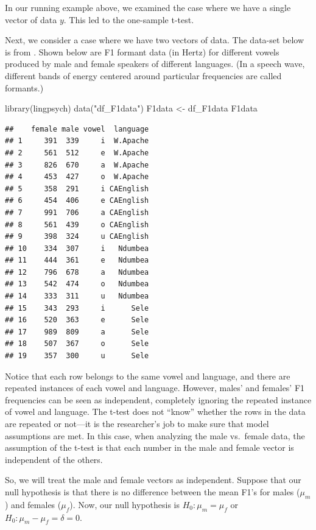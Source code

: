 \documentclass[
  12pt,
]{krantz}
\newenvironment{Shaded}{\begin{snugshade}}{\end{snugshade}}
\newcommand{\FunctionTok}[1]{\textcolor[rgb]{0.00,0.00,0.00}{#1}}
\newcommand{\NormalTok}[1]{#1}
\newcommand{\OtherTok}[1]{\textcolor[rgb]{0.56,0.35,0.01}{#1}}
\newcommand{\StringTok}[1]{\textcolor[rgb]{0.31,0.60,0.02}{#1}}
\theoremstyle{definition}
\theoremstyle{definition}
\theoremstyle{definition}
\theoremstyle{definition}
\theoremstyle{remark}
\begin{document}
In our running example above, we examined the case where we have a single vector of data \(y\). This led to the one-sample t-test.

Next, we consider a case where we have two vectors of data. The data-set below is from \citet{johnson2011quantitative}. Shown below are F1 formant data (in Hertz) for different vowels produced by male and female speakers of different languages. (In a speech wave, different bands of energy centered around particular frequencies are called formants.)

\begin{Shaded}
\begin{Highlighting}[]
\FunctionTok{library}\NormalTok{(lingpsych)}
\FunctionTok{data}\NormalTok{(}\StringTok{"df\_F1data"}\NormalTok{)}
\NormalTok{F1data }\OtherTok{\textless{}{-}}\NormalTok{ df\_F1data}
\NormalTok{F1data}
\end{Highlighting}
\end{Shaded}

\begin{verbatim}
##    female male vowel  language
## 1     391  339     i  W.Apache
## 2     561  512     e  W.Apache
## 3     826  670     a  W.Apache
## 4     453  427     o  W.Apache
## 5     358  291     i CAEnglish
## 6     454  406     e CAEnglish
## 7     991  706     a CAEnglish
## 8     561  439     o CAEnglish
## 9     398  324     u CAEnglish
## 10    334  307     i   Ndumbea
## 11    444  361     e   Ndumbea
## 12    796  678     a   Ndumbea
## 13    542  474     o   Ndumbea
## 14    333  311     u   Ndumbea
## 15    343  293     i      Sele
## 16    520  363     e      Sele
## 17    989  809     a      Sele
## 18    507  367     o      Sele
## 19    357  300     u      Sele
\end{verbatim}

Notice that each row belongs to the same vowel and language, and there are repeated instances of each vowel and language. However, males' and females' F1 frequencies can be seen as independent, completely ignoring the repeated instance of vowel and language. The t-test does not ``know'' whether the rows in the data are repeated or not---it is the researcher's job to make sure that model assumptions are met. In this case, when analyzing the male vs.~female data, the assumption of the t-test is that each number in the male and female vector is independent of the others.

So, we will treat the male and female vectors as independent. Suppose that our null hypothesis is that there is no difference between the mean F1's for males (\(\mu_m\)) and females (\(\mu_f\)).
Now, our null hypothesis is \(H_0: \mu_m = \mu_f\) or \(H_0: \mu_m - \mu_f = \delta = 0\).
\end{document}
